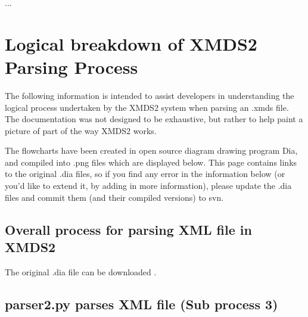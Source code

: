 \documentclass[letterpaper,10pt,english]{sphinxmanual}
\begin{document}
\begin{sphinxVerbatim}[commandchars=\\\{\}]
   
    ...
\end{sphinxVerbatim}
\label{\detokenize{developer:logicalbreakdownparsingprocess}}
\ignorespaces 

\section{Logical breakdown of XMDS2 Parsing Process}
\label{\detokenize{developer:logical-breakdown-of-xmds2-parsing-process}}\label{\detokenize{developer:index-5}}
\sphinxAtStartPar
The following information is intended to assist developers in understanding the logical process undertaken by the XMDS2 system when parsing an .xmds file. The documentation was not designed to be exhaustive, but rather to help paint a picture of part of the way XMDS2 works.

\sphinxAtStartPar
The flowcharts have been created in open source diagram drawing program Dia, and compiled into .png files which are displayed below. This page contains links to the original .dia files, so if you find any error in the information below (or you’d like to extend it, by adding in more information), please update the .dia files and commit them (and their compiled versions) to svn.


\subsection{Overall process for parsing XML file in XMDS2}
\label{\detokenize{developer:overall-process-for-parsing-xml-file-in-xmds2}}

\sphinxAtStartPar
The original .dia file can be downloaded .


\subsection{parser2.py parses XML file (Sub process 3)}
\label{\detokenize{developer:parser2-py-parses-xml-file-sub-process-3}}
\end{document}
